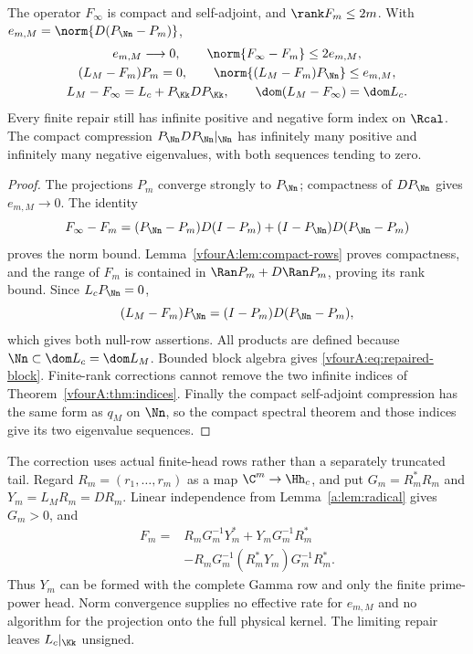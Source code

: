 \begin{theorem}
\label{vfourA:thm:repair}
The operator $F_\infty$ is compact and self-adjoint, and
$\rank F_m\le2m$.  With $e_{m,M}=\norm{D(P_\Nn-P_m)}$,
\begin{gather}
 e_{m,M}\longrightarrow0,\qquad
 \norm{F_\infty-F_m}\le2e_{m,M},\label{vfourA:eq:repair-error}\\
 (L_M-F_m)P_m=0,\qquad
 \norm{(L_M-F_m)P_\Nn}\le e_{m,M},\label{vfourA:eq:null-row}\\
 L_M-F_\infty=L_c+P_\Kk DP_\Kk,
 \qquad\dom(L_M-F_\infty)=\dom L_c.\label{vfourA:eq:repaired-block}
\end{gather}
Every finite repair still has infinite positive and negative form
index on $\Rcal$.  The compact compression
$P_\Nn DP_\Nn|_\Nn$ has infinitely many positive and infinitely many
negative eigenvalues, with both sequences tending to zero.
\end{theorem}
\begin{proof}
The projections $P_m$ converge strongly to $P_\Nn$; compactness of
$DP_\Nn$ gives $e_{m,M}\to0$.  The identity
\[
 F_\infty-F_m=(P_\Nn-P_m)D(I-P_m)
                 +(I-P_\Nn)D(P_\Nn-P_m)
\]
proves the norm bound.  Lemma~\ref{vfourA:lem:compact-rows} proves
compactness, and the range of $F_m$ is contained in
$\Ran P_m+D\Ran P_m$, proving its rank bound.
Since $L_cP_\Nn=0$,
\[
 (L_M-F_m)P_\Nn=(I-P_m)D(P_\Nn-P_m),
\]
which gives both null-row assertions.  All products are defined
because $\Nn\subset\dom L_c=\dom L_M$.  Bounded block algebra gives
\eqref{vfourA:eq:repaired-block}.  Finite-rank corrections cannot remove
the two infinite indices of Theorem~\ref{vfourA:thm:indices}.
Finally the compact self-adjoint compression has the same form as
$q_M$ on $\Nn$, so the compact spectral theorem and those indices
give its two eigenvalue sequences.
\end{proof}

The correction uses actual finite-head rows rather than a separately
truncated tail.  Regard $R_m=(r_1,\ldots,r_m)$ as a map
$\C^m\to\Hh_c$, and put $G_m=R_m^*R_m$ and
$Y_m=L_MR_m=DR_m$.  Linear independence from
Lemma~\ref{a:lem:radical} gives $G_m>0$, and
\begin{equation}\label{vfourA:eq:row-formula}
 \begin{split}
 F_m={}&R_mG_m^{-1}Y_m^*+Y_mG_m^{-1}R_m^*\\
       &-R_mG_m^{-1}(R_m^*Y_m)G_m^{-1}R_m^*.
 \end{split}
\end{equation}
Thus $Y_m$ can be formed with the complete Gamma row and only the
finite prime-power head.  Norm convergence supplies no effective
rate for $e_{m,M}$ and no algorithm for the projection onto the full
physical kernel.  The limiting repair leaves $L_c|_\Kk$ unsigned.

